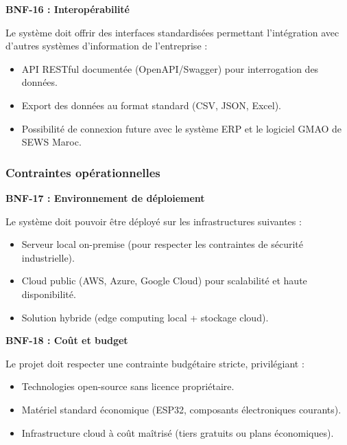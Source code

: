\textbf{BNF-16 : Interopérabilité}

Le système doit offrir des interfaces standardisées permettant l'intégration avec d'autres systèmes d'information de l'entreprise :

\begin{itemize}
    \item API RESTful documentée (OpenAPI/Swagger) pour interrogation des données.
    \item Export des données au format standard (CSV, JSON, Excel).
    \item Possibilité de connexion future avec le système ERP et le logiciel GMAO de SEWS Maroc.
\end{itemize}

\subsubsection{Contraintes opérationnelles}

\textbf{BNF-17 : Environnement de déploiement}

Le système doit pouvoir être déployé sur les infrastructures suivantes :

\begin{itemize}
    \item Serveur local on-premise (pour respecter les contraintes de sécurité industrielle).
    \item Cloud public (AWS, Azure, Google Cloud) pour scalabilité et haute disponibilité.
    \item Solution hybride (edge computing local + stockage cloud).
\end{itemize}

\textbf{BNF-18 : Coût et budget}

Le projet doit respecter une contrainte budgétaire stricte, privilégiant :

\begin{itemize}
    \item Technologies open-source sans licence propriétaire.
    \item Matériel standard économique (ESP32, composants électroniques courants).
    \item Infrastructure cloud à coût maîtrisé (tiers gratuits ou plans économiques).
\end{itemize}

